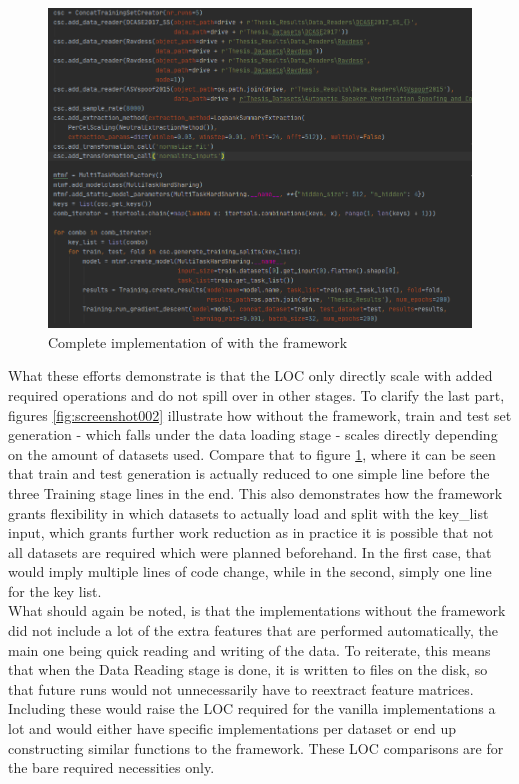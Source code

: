 \begin{figure}
	\centering
	\includegraphics[width=\linewidth]{screenshot003}
	\caption{Complete implementation of \cite{georgiev2017low} with the framework}
	\label{fig:screenshot003}
\end{figure}

What these efforts demonstrate is that the LOC only directly scale with added required operations and do not spill over in other stages. To clarify the last part, figures \ref{fig:screenshot002} illustrate how without the framework, train and test set generation - which falls under the data loading stage - scales directly depending on the amount of datasets used. Compare that to figure \ref{fig:screenshot003}, where it can be seen that train and test generation is actually reduced to one simple line before the three Training stage lines in the end. This also demonstrates how the framework grants flexibility in which datasets to actually load and split with the key\_list input, which grants further work reduction as in practice it is possible that not all datasets are required which were planned beforehand. In the first case, that would imply multiple lines of code change, while in the second, simply one line for the key list. \\

What should again be noted, is that the implementations without the framework did not include a lot of the extra features that are performed automatically, the main one being quick reading and writing of the data. To reiterate, this means that when the Data Reading stage is done, it is written to files on the disk, so that future runs would not unnecessarily have to reextract feature matrices. Including these would raise the LOC required for the vanilla implementations a lot and would either have specific implementations per dataset or end up constructing similar functions to the framework. These LOC comparisons are for the bare required necessities only.\\



